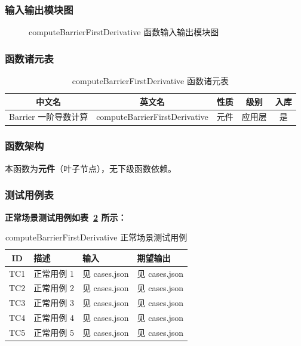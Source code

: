 \documentclass[a4paper,10pt]{article}
\begin{document}
\subsubsection{输入输出模块图}
\begin{figure}[h]
    \centering
    \caption{computeBarrierFirstDerivative 函数输入输出模块图}
    \label{fig:io_computeBarrierFirstDerivative}
\end{figure}
\subsubsection{函数诸元表}
\begin{table}[h]
    \centering
    \caption{computeBarrierFirstDerivative 函数诸元表}
    \label{tab:meta_computeBarrierFirstDerivative}
    \begin{tabular}{|c|c|c|c|c|}
        \hline
        中文名 & 英文名 & 性质 & 级别 & 入库 \\ \hline
        Barrier 一阶导数计算 & computeBarrierFirstDerivative & 元件 & 应用层 & 是 \\ \hline
    \end{tabular}
\end{table}
\subsubsection{函数架构}
\par 本函数为\textbf{元件}（叶子节点），无下级函数依赖。

\subsubsection{测试用例表}
\noindent\textbf{正常场景测试用例如表~\ref{tab:normal_computeBarrierFirstDerivative} 所示：}
\begin{table}[h]
\centering
\caption{computeBarrierFirstDerivative 正常场景测试用例}
\label{tab:normal_computeBarrierFirstDerivative}
\begin{tabular}{|c|p{3.5cm}|p{3.5cm}|p{3.5cm}|}
\hline
ID & 描述 & 输入 & 期望输出 \\ \hline
  TC1 & 正常用例 1 & 见 cases.json & 见 cases.json \\ \hline
  TC2 & 正常用例 2 & 见 cases.json & 见 cases.json \\ \hline
  TC3 & 正常用例 3 & 见 cases.json & 见 cases.json \\ \hline
  TC4 & 正常用例 4 & 见 cases.json & 见 cases.json \\ \hline
  TC5 & 正常用例 5 & 见 cases.json & 见 cases.json \\ \hline
\end{tabular}
\end{table}
\end{document}
